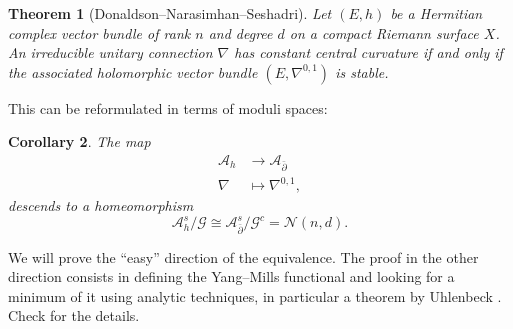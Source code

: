 \documentclass[12pt,a4paper]{book}
\newtheorem{thm}{Theorem}[section]
\newtheorem{corol}[thm]{Corollary}
\theoremstyle{definition} \newtheorem{defn}[thm]{Definition}
\theoremstyle{definition} \newtheorem{ejemplo}[thm]{Example}
\theoremstyle{remark} \newtheorem{rem}[thm]{Remark}
\def\AA{\mathscr{A}}
\def\GG{\mathscr{G}}
\def\Bun{\mathscr{N}}
\def\delbar{\bar{\partial}}
\begin{document}
\begin{thm}[Donaldson--Narasimhan--Seshadri]\label{narasimhanseshadri}
  Let $(E,h)$ be a Hermitian complex vector bundle of rank $n$ and degree $d$ on a compact Riemann surface $X$. An irreducible unitary connection $\nabla$ has constant central curvature if and only if the associated holomorphic vector bundle $(E,\nabla^{0,1})$ is stable.
\end{thm}
This can be reformulated in terms of moduli spaces:
\begin{corol}
  The map
  \begin{align*}
    \AA_h&\longrightarrow \AA_{\delbar}\\ 
     \nabla &\longmapsto \nabla^{0,1}, 
    \end{align*}
    descends to a homeomorphism
    \begin{equation*}
      \AA_h^s/\GG \cong \AA^s_{\delbar} /\GG^c = \Bun(n,d).
    \end{equation*}
\end{corol}
We will prove the ``easy'' direction of the equivalence. The proof in the other direction consists in defining the Yang--Mills functional and looking for a minimum of it using analytic techniques, in particular a theorem by Uhlenbeck \cite{uhlenbeck}. Check \cite{donaldson} for the details.
\end{document}
